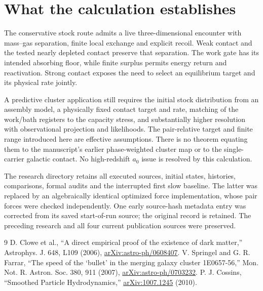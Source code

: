 \documentclass[11pt]{article}
\begin{document}
\section{What the calculation establishes}
The conservative stock route admits a live three-dimensional encounter with
mass--gas separation, finite local exchange and explicit recoil. Weak contact
and the tested nearly depleted contact preserve that separation. The work gate
has its intended absorbing floor, while finite surplus permits energy return
and reactivation. Strong contact exposes the need to select an equilibrium
target and its physical rate jointly.

A predictive cluster application still requires the initial stock distribution
from an assembly model, a physically fixed contact target and rate, matching
of the work/bath registers to the capacity stress, and substantially higher
resolution with observational projection and likelihoods. The pair-relative
target and finite range introduced here are effective assumptions. There is
no theorem equating them to the manuscript's earlier phase-weighted cluster
map or to the single-carrier galactic contact. No high-redshift $a_0$ issue is
resolved by this calculation.

The research directory retains all executed sources, initial states,
histories, comparisons, formal audits and the interrupted first slow baseline.
The latter was replaced by an algebraically identical optimized force
implementation, whose pair forces were checked independently. One early
source-hash metadata entry was corrected from its saved start-of-run source;
the original record is retained. The preceding research and all four current
publication sources were preserved.

\begin{thebibliography}{9}
 D. Clowe et al., ``A direct empirical proof of the existence
of dark matter,'' Astrophys. J. 648, L109 (2006),
\href{https://arxiv.org/abs/astro-ph/0608407}{arXiv:astro-ph/0608407}.
 V. Springel and G. R. Farrar, ``The speed of the `bullet'
in the merging galaxy cluster 1E0657-56,'' Mon. Not. R. Astron. Soc. 380,
911 (2007), \href{https://arxiv.org/abs/astro-ph/0703232}{arXiv:astro-ph/0703232}.
 P. J. Cossins, ``Smoothed Particle Hydrodynamics,''
\href{https://arxiv.org/abs/1007.1245}{arXiv:1007.1245} (2010).
\end{thebibliography}
\end{document}
